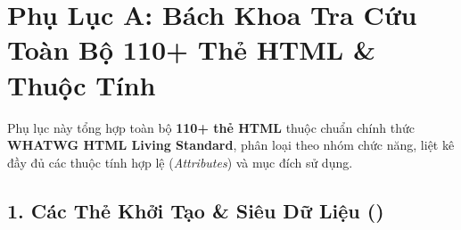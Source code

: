 \chapter{Phụ Lục A: Bách Khoa Tra Cứu Toàn Bộ 110+ Thẻ HTML \& Thuộc Tính}
\label{chap:appendix_html_tags}

Phụ lục này tổng hợp toàn bộ \textbf{110+ thẻ HTML} thuộc chuẩn chính thức \textbf{WHATWG HTML Living Standard}, phân loại theo nhóm chức năng, liệt kê đầy đủ các thuộc tính hợp lệ (\textit{Attributes}) và mục đích sử dụng.

\section{1. Các Thẻ Khởi Tạo \& Siêu Dữ Liệu ()}

